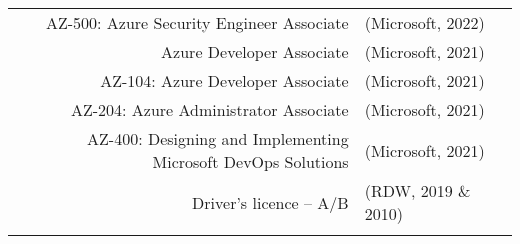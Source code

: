 \begin{tabular}{@{} r l c @{}}
AZ-500: Azure Security Engineer Associate & (Microsoft, 2022) & \\
Azure Developer Associate & (Microsoft, 2021) & \\
AZ-104: Azure Developer Associate & (Microsoft, 2021) & \\
AZ-204: Azure Administrator Associate & (Microsoft, 2021) & \\
AZ-400: Designing and Implementing Microsoft DevOps Solutions & (Microsoft, 2021) & \\
Driver’s licence – A/B & (RDW, 2019 \& 2010) & \(\left.\begin{array}{c} \\ \end{array}\right\}\) Other \\
\end{tabular}
